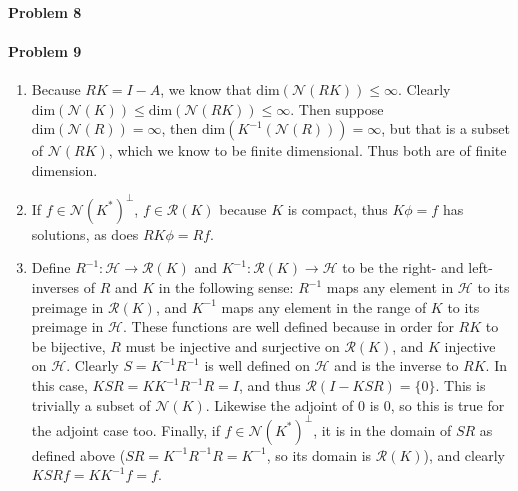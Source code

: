 \documentclass[12pt]{article}
\renewcommand{\dim}{\text{dim}}
\renewcommand{\null}{\mathcal{N}}
\newcommand{\ran}{\mathcal{R}}
\newcommand{\R}{\mathcal{R}}
\renewcommand{\H}{\mathcal{H}}
\begin{document}
\paragraph{Problem 8}

\paragraph{Problem 9}

\begin{enumerate}[label=\alph*)]
\item Because $RK = I-A$, we know that $\dim(\null(RK)) \leq \infty$. Clearly
  $\dim(\null(K)) \leq \dim(\null(RK)) \leq \infty$. Then suppose $\dim(\null(R))
  = \infty$, then $\dim(K^{-1}(\null(R))) = \infty$, but that is a subset of
  $\null(RK)$, which we know to be finite dimensional. Thus both are of finite
  dimension.
\item If $f \in \null(K^*)^\bot$,  $f \in \ran(K)$ because $K$ is compact, thus
  $K\phi = f$ has solutions, as does $RK\phi = Rf$. 
\item Define $R^{-1}: \mathcal{H} \to \R(K)$ and $K^{-1}: \R(K)\to\mathcal{H}$
  to be the right- and left-inverses of $R$ and $K$ in the following sense:
  $R^{-1}$ maps any element in $\H$ to its preimage in $\R(K)$, and $K^{-1}$
  maps any element in the range of $K$ to its preimage in $\H$. These functions
  are well defined because in order for $RK$ to be bijective, $R$ must be
  injective and surjective on $\R(K)$, and $K$ injective on $\H$. Clearly $S =
  K^{-1}R^{-1}$ is well defined on $\H$ and is the inverse to $RK$. In this case,
  $KSR = KK^{-1}R^{-1}R = I$, and thus $\R(I-KSR) = \{0\}$.
  This is trivially a subset of $\null(K)$. Likewise the adjoint of 0 is 0,
  so this is true for the adjoint case too. Finally, if $f\in\null(K^*)^\bot$, it
  is in the domain of $SR$ as defined above ($SR = K^{-1}R^{-1}R = K^{-1}$, so
  its domain is $\R(K)$), and clearly $KSRf = KK^{-1}f = f$.
\end{enumerate}
\end{document}
